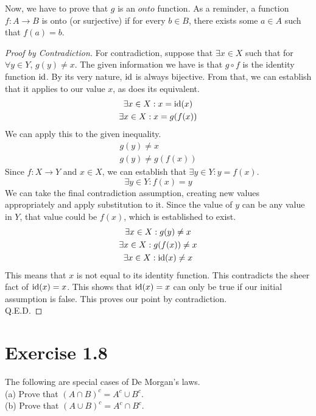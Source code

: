 \documentclass[12pt]{report}
\begin{document}
Now, we have to prove that $g$ is an $onto$ function.
As a reminder, a function $f: A \rightarrow B$ is onto (or surjective) if for every $b \in B$, there exists some $a \in A$ such that $f(a) = b$.
\begin{proof}[Proof by Contradiction]
    For contradiction, suppose that $\exists x \in X$ such that for $\forall y \in Y$, $g(y) \ne x$.
    The given information we have is that $g \circ f$ is the identity function $\text{id}$.
    By its very nature, $\text{id}$ is always bijective. 
    From that, we can establish that it applies to our value $x$, as does its equivalent.
    \begin{gather}
        \exists x \in X: x = \text{id}(x)\\
        \exists x \in X: x = g(f(x))
    \end{gather}
    We can apply this to the given inequality.
    \begin{gather}
        g(y) \ne x\\
        g(y) \ne g(f(x))
    \end{gather}
    Since $f: X \to Y$ and $x \in X$, we can establish that $\exists y \in Y: y = f(x)$.
    \begin{equation}
        \exists y \in Y: f(x) = y
    \end{equation}
    We can take the final contradiction assumption, creating new values appropriately and apply substitution to it.
    Since the value of $y$ can be any value in $Y$, that value could be $f(x)$, which is established to exist.
    \begin{gather}
        \exists x \in X: g(y) \ne x\\
        \exists x \in X: g(f(x)) \ne x\\
        \exists x \in X: \text{id}(x) \ne x
    \end{gather}
    This means that $x$ is not equal to its identity function.
    This contradicts the sheer fact of $\text{id}(x) = x$.
    This shows that $\text{id}(x) = x$ can only be true if our initial assumption is false.
    This proves our point by contradiction.\\
    Q.E.D.
\end{proof}


\pagebreak
\section{Exercise 1.8}
The following are special cases of De Morgan's laws.\\
(a) Prove that $(A \cap B)^c = A^c \cup B^c$. \\
(b) Prove that $(A \cup B)^c = A^c \cap B^c$. 
\end{document}

